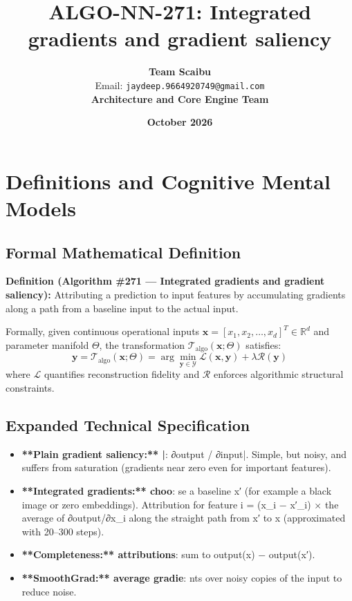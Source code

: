 \documentclass[11pt,a4paper]{article}
\title{\textbf{ALGO-NN-271: Integrated gradients and gradient saliency}}
\author{\textbf{Team Scaibu} \\ \small Email: \texttt{jaydeep.9664920749@gmail.com} \\ \small \textbf{Architecture and Core Engine Team}}
\date{\textbf{October 2026}}
\theoremstyle{definition}
\begin{document}
\maketitle

\section{Definitions and Cognitive Mental Models}

\subsection{Formal Mathematical Definition}
\textbf{Definition (Algorithm \#271 --- Integrated gradients and gradient saliency):}
Attributing a prediction to input features by accumulating gradients along a path from a baseline input to the actual input.

Formally, given continuous operational inputs $\mathbf{x} = [x_1, x_2, \dots, x_d]^T \in \mathbb{R}^d$ and parameter manifold $\Theta$, the transformation $\mathcal{T}_{\text{algo}}(\mathbf{x}; \Theta)$ satisfies:
{\boldmath
\begin{equation}
\mathbf{y} = \mathcal{T}_{\text{algo}}(\mathbf{x}; \Theta) = \arg\min_{\mathbf{y} \in \mathcal{Y}} \mathcal{L}(\mathbf{x}, \mathbf{y}) + \lambda \mathcal{R}(\mathbf{y})
\end{equation}
}
where $\mathcal{L}$ quantifies reconstruction fidelity and $\mathcal{R}$ enforces algorithmic structural constraints.

\subsection{Expanded Technical Specification}
\begin{itemize}
\item \textbf{**Plain gradient saliency:** |}: ∂output / ∂input|. Simple, but noisy, and suffers from saturation (gradients near zero even for important features).
\item \textbf{**Integrated gradients:** choo}: se a baseline x′ (for example a black image or zero embeddings). Attribution for feature i = (x\_i − x′\_i) × the average of ∂output/∂x\_i along the straight path from x′ to x (approximated with 20–300 steps).
\item \textbf{**Completeness:** attributions}:  sum to output(x) − output(x′).
\item \textbf{**SmoothGrad:** average gradie}: nts over noisy copies of the input to reduce noise.
\end{itemize}
\end{document}
